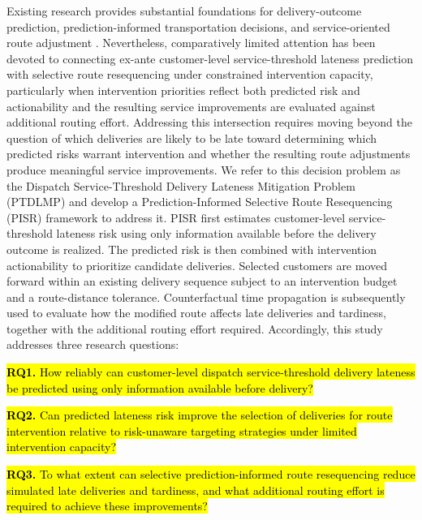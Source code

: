 \documentclass[11pt,a4paper]{article}
\begin{document}
Existing research provides substantial foundations for delivery-outcome
prediction, prediction-informed transportation decisions, and
service-oriented route adjustment
\cite{florio2018,pegado2023,dieter2023,ozarik2024}. Nevertheless,
comparatively limited attention has been devoted to connecting ex-ante
customer-level service-threshold lateness prediction with selective route
resequencing under constrained intervention capacity, particularly when
intervention priorities reflect both predicted risk and actionability
and the resulting service improvements are evaluated against additional
routing effort. Addressing this intersection requires moving beyond the
question of which deliveries are likely to be late toward determining
which predicted risks warrant intervention and whether the resulting
route adjustments produce meaningful service improvements. We refer to
this decision problem as the Dispatch Service-Threshold Delivery Lateness Mitigation
Problem (PTDLMP) and develop a Prediction-Informed Selective Route
Resequencing (PISR) framework to address it. PISR first estimates
customer-level service-threshold lateness risk using only information
available before the delivery outcome is realized. The predicted risk is
then combined with intervention actionability to prioritize candidate
deliveries. Selected customers are moved forward within an existing
delivery sequence subject to an intervention budget and a route-distance
tolerance. Counterfactual time propagation is subsequently used to
evaluate how the modified route affects late deliveries and tardiness,
together with the additional routing effort required. Accordingly, this
study addresses three research questions:

\hl{\textbf{RQ1.} How reliably can customer-level dispatch service-threshold delivery
lateness be predicted using only information available before delivery?}

\hl{\textbf{RQ2.} Can predicted lateness risk improve the selection of
deliveries for route intervention relative to risk-unaware targeting
strategies under limited intervention capacity?}

\hl{\textbf{RQ3.} To what extent can selective prediction-informed route
resequencing reduce simulated late deliveries and tardiness, and what
additional routing effort is required to achieve these improvements?}
\end{document}
